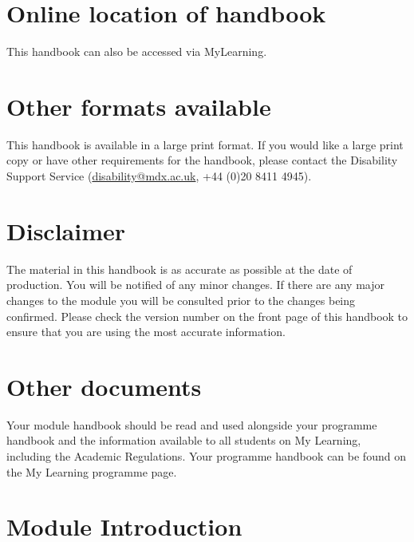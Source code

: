 \documentclass{MDXHandbook}
\begin{document}
\maketitle

\section*{Online location of handbook}
This handbook can also be accessed via MyLearning.

\section*{Other formats available}
This handbook is available in a large print format. If you would like a large print copy or have other requirements for the handbook, please contact the Disability Support Service (\href{mailto:disability@mdx.ac.uk}{disability@mdx.ac.uk}, +44 (0)20 8411 4945). 

\section*{Disclaimer}
The material in this handbook is as accurate as possible at the date of production. You will be notified of any minor changes. If there are any major changes to the module you will be consulted prior to the changes being confirmed. Please check the version number on the front page of this handbook to ensure that you are using the most accurate information.

\section*{Other documents}
Your module handbook should be read and used alongside your programme handbook and the information available to all students on My Learning, including the Academic Regulations. Your programme handbook can be found on the My Learning programme page.

\newpage
\tableofcontents

\newpage
\section{Module Introduction}
\end{document}
